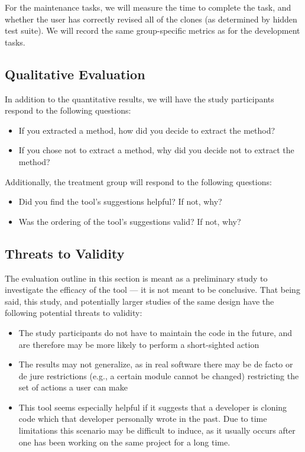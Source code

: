 \documentclass[preprint,10pt]{sigplanconf}
\begin{document}
For the maintenance tasks, we will measure the time to complete the
task, and whether the user has correctly revised all of the clones (as
determined by hidden test suite). We will record the same
group-specific metrics as for the development tasks.

\subsection{Qualitative Evaluation}
In addition to the quantitative results, we will have the study
participants respond to the following questions:

\begin{itemize}
  \item If you extracted a method, how did you decide to extract the
    method? 
  \item If you chose not to extract a method, why did you decide not
    to extract the method?
\end{itemize}

\noindent Additionally, the treatment group will respond to the following
questions:

\begin{itemize}
  \item Did you find the tool's suggestions helpful? If not, why?
  \item Was the ordering of the tool's suggestions valid? If not, why?
\end{itemize}

\subsection{Threats to Validity}
The evaluation outline in this section is meant as a preliminary study
to investigate the efficacy of the tool --- it is not meant to be
conclusive. That being said, this study, and potentially larger
studies of the same design have the following potential threats to
validity:

\begin{itemize}
  \item The study participants do not have to maintain the code in the
    future, and are therefore may be more likely to perform a
    short-sighted action
  \item The results may not generalize, as in real software there may
    be de facto or de jure restrictions (e.g., a certain module cannot
    be changed) restricting the set of actions a user can make
  \item This tool seems especially helpful if it suggests that a
    developer is cloning code which that developer personally wrote in the
    past.  Due to time limitations this scenario may be difficult to
    induce, as it usually occurs after one has been working on the
    same project for a long time.
\end{itemize}
\end{document}
